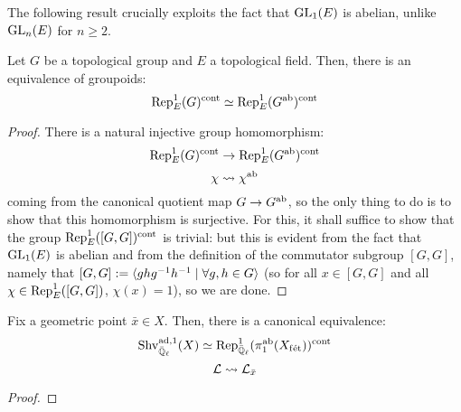         The following result crucially exploits the fact that $\operatorname{GL}_1(E)$ is abelian, unlike $\operatorname{GL}_n(E)$ for $n \geq 2$.
        \begin{lemma} \label{lemma: abelianising_continuous_characters}
            Let $G$ be a topological group and $E$ a topological field. Then, there is an equivalence of groupoids:
                $$\mathrm{Rep}^1_E(G)^{\mathrm{cont}} \simeq \mathrm{Rep}^1_E(G^{\mathrm{ab}})^{\mathrm{cont}}$$
        \end{lemma}
            \begin{proof}
                There is a natural injective group homomorphism:
                    $$\mathrm{Rep}^1_E(G)^{\mathrm{cont}} \to \mathrm{Rep}^1_E(G^{\mathrm{ab}})^{\mathrm{cont}}$$
                    $$\chi \leadsto \chi^{\mathrm{ab}}$$
                coming from the canonical quotient map $G \to G^{\mathrm{ab}}$, so the only thing to do is to show that this homomorphism is surjective. For this, it shall suffice to show that the group $\mathrm{Rep}^1_E([G, G])^{\mathrm{cont}}$ is trivial: but this is evident from the fact that $\operatorname{GL}_1(E)$ is abelian and from the definition of the commutator subgroup $[G, G]$, namely that $[G, G] := \langle ghg^{-1}h^{-1} \mid \forall g, h \in G\rangle$ (so for all $x \in [G, G]$ and all $\chi \in \mathrm{Rep}^1_E([G, G])$, $\chi(x) = 1$), so we are done.
            \end{proof}
            
        \begin{theorem} \label{theorem: galois_representations_are_sheaves_on_X}
            Fix a geometric point $\bar{x} \in X$. Then, there is a canonical equivalence:
                $$\mathrm{Shv}_{\bar{\mathbb{Q}}_{\ell}}^{\mathrm{ad}, 1}(X) \simeq \mathrm{Rep}^1_{\bar{\mathbb{Q}}_{\ell}}(\pi_1^{\mathrm{ab}}(X_{\mathrm{f\acute{e}t}}))^{\mathrm{cont}}$$
                $$\mathcal{L} \leadsto \mathcal{L}_{\bar{x}}$$
        \end{theorem}
            \begin{proof}
                
            \end{proof}